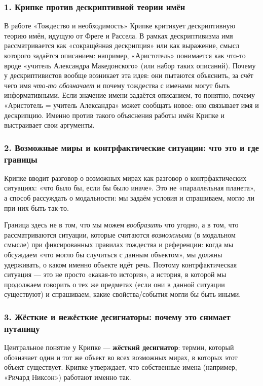 \documentclass[a4paper,12pt]{article}
\begin{document}
\subsubsection*{1. Крипке против дескриптивной теории имён}

В работе «Тождество и необходимость» Крипке критикует дескриптивную теорию имён, идущую от Фреге и Рассела. В рамках дескриптивизма имя рассматривается как «сокращённая дескрипция» или как выражение, смысл которого задаётся описанием: например, «Аристотель» понимается как что-то вроде «учитель Александра Македонского» (или набор таких описаний). Почему у дескриптивистов вообще возникает эта идея: они пытаются объяснить, за счёт чего имя \emph{что-то обозначает} и почему тождества с именами могут быть информативными. Если значение имени задаётся описанием, то понятно, почему «Аристотель = учитель Александра» может сообщать новое: оно связывает имя и дескрипцию. Именно против такого объяснения работы имён Крипке и выстраивает свои аргументы.

\subsubsection*{2. Возможные миры и контрфактические ситуации: что это и где границы}

Крипке вводит разговор о возможных мирах как разговор о контрфактических ситуациях: «что было бы, если бы было иначе». Это не «параллельная планета», а способ рассуждать о модальности: мы задаём условия и спрашиваем, могло ли при них быть так-то.

Граница здесь не в том, что мы можем \emph{вообразить} что угодно, а в том, что рассматриваются ситуации, которые считаются \emph{возможными} (в модальном смысле) при фиксированных правилах тождества и референции: когда мы обсуждаем «что могло бы случиться с данным объектом», мы должны удерживать, о каком именно объекте идёт речь. Поэтому контрфактическая ситуация — это не просто «какая-то история», а история, в которой мы продолжаем говорить о тех же предметах (если они в данной ситуации существуют) и спрашиваем, какие свойства/события могли бы быть иными.

\subsubsection*{3. Жёсткие и нежёсткие десигнаторы: почему это снимает путаницу}

Центральное понятие у Крипке — \textbf{жёсткий десигнатор}: термин, который обозначает один и тот же объект во всех возможных мирах, в которых этот объект существует. Крипке утверждает, что собственные имена (например, «Ричард Никсон») работают именно так.
\end{document}
